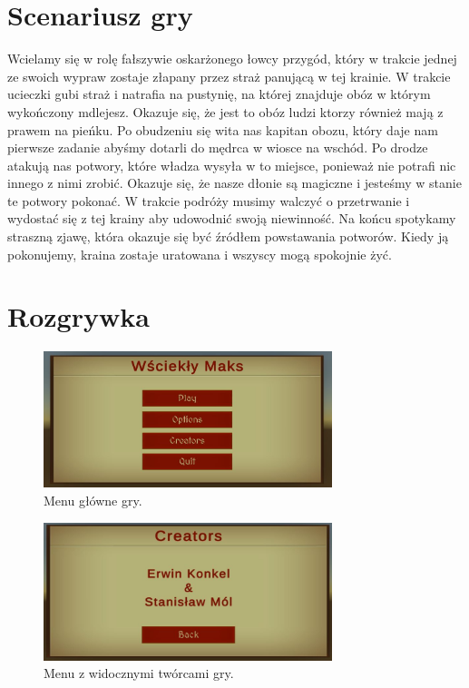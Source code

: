 \documentclass[10pt,a4paper]{article}
\begin{document}
\section{Scenariusz gry}
Wcielamy się w rolę fałszywie oskarżonego łowcy przygód, który w trakcie jednej ze swoich wypraw zostaje złapany przez straż panującą w tej krainie. W trakcie ucieczki gubi straż i natrafia na pustynię, na której znajduje obóz w którym wykończony mdlejesz. Okazuje się, że jest to obóz ludzi ktorzy również mają z prawem na pieńku. Po obudzeniu się wita nas kapitan obozu, który daje nam pierwsze zadanie abyśmy dotarli do mędrca w wiosce na wschód. Po drodze atakują nas potwory, które władza wysyła w to miejsce, ponieważ nie potrafi nic innego z nimi zrobić. Okazuje się, że nasze dłonie są magiczne i jesteśmy w stanie te potwory pokonać. W trakcie podróży musimy walczyć o przetrwanie i wydostać się z tej krainy aby udowodnić swoją niewinność. Na końcu spotykamy straszną zjawę, która okazuje się być źródłem powstawania potworów. Kiedy ją pokonujemy, kraina zostaje uratowana i wszyscy mogą spokojnie żyć.

\clearpage
\section{Rozgrywka}

\begin{figure}[ht!]
\begin{center}
\includegraphics[width=0.75\textwidth]{pictures/MainMenu.jpg}
\end{center}
\caption{Menu główne gry.}
\end{figure}

\begin{figure}[ht!]
\begin{center}
\includegraphics[width=0.75\textwidth]{pictures/Creators.jpg}
\end{center}
\caption{Menu z widocznymi twórcami gry.}
\end{figure}
\end{document}
